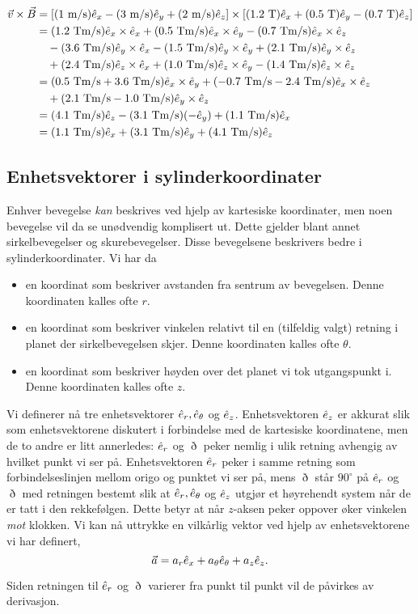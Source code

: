 \begin{displaymath}
\begin{aligned}
	\vec{v}\times\vec{B} &= \left[ (1~\mathrm{m/s})\hat{e}_x - (3~\mathrm{m/s})\hat{e}_y + (2~\mathrm{m/s})\hat{e}_z \right] \times
	\left[(1.2~\mathrm{T})\hat{e}_x + (0.5~\mathrm{T})\hat{e}_y - (0.7~\mathrm{T})\hat{e}_z\right] \\
	&= (1.2~\mathrm{Tm/s})\hat{e}_x\times\hat{e}_x + (0.5~\mathrm{Tm/s})\hat{e}_x\times\hat{e}_y -  (0.7~\mathrm{Tm/s})\hat{e}_x\times\hat{e}_z \\
	&\quad- (3.6~\mathrm{Tm/s})\hat{e}_y\times\hat{e}_x- (1.5~\mathrm{Tm/s})\hat{e}_y\times\hat{e}_y+ (2.1~\mathrm{Tm/s})\hat{e}_y\times\hat{e}_z \\
	&\quad+ (2.4~\mathrm{Tm/s})\hat{e}_z\times\hat{e}_x+ (1.0~\mathrm{Tm/s})\hat{e}_z\times\hat{e}_y -  (1.4~\mathrm{Tm/s})\hat{e}_z\times\hat{e}_z \\
	&=(0.5~\mathrm{Tm/s}+3.6~\mathrm{Tm/s})\hat{e}_x\times\hat{e}_y + (-0.7~\mathrm{Tm/s}-2.4~\mathrm{Tm/s})\hat{e}_x\times\hat{e}_z \\
	&\quad+(2.1~\mathrm{Tm/s}-1.0~\mathrm{Tm/s})\hat{e}_y\times\hat{e}_z \\
	&=(4.1~\mathrm{Tm/s})\hat{e}_z - (3.1~\mathrm{Tm/s})(-\hat{e}_y) +(1.1~\mathrm{Tm/s})\hat{e}_x \\
	&=(1.1~\mathrm{Tm/s})\hat{e}_x + (3.1~\mathrm{Tm/s})\hat{e}_y + (4.1~\mathrm{Tm/s})\hat{e}_z
\end{aligned}
\end{displaymath}

\subsection{Enhetsvektorer i sylinderkoordinater}
Enhver bevegelse \emph{kan} beskrives ved hjelp av kartesiske koordinater, men noen bevegelse vil da se unødvendig komplisert ut. Dette gjelder blant annet sirkelbevegelser og skurebevegelser. Disse bevegelsene beskrivers bedre i sylinderkoordinater. Vi har da
\begin{itemize}
\item
 en koordinat som beskriver avstanden fra sentrum av bevegelsen. Denne koordinaten kalles ofte $r$.
\item
 en koordinat som beskriver vinkelen relativt til en (tilfeldig valgt) retning i planet der sirkelbevegelsen skjer. Denne koordinaten kalles ofte $\theta$.
\item
en koordinat som beskriver høyden over det planet vi tok utgangspunkt i. Denne koordinaten kalles ofte $z$. 
\end{itemize}
Vi definerer nå tre enhetsvektorer $\hat{e}_r, \hat{e}_\theta$ og $\hat{e}_z$. Enhetsvektoren $\hat{e}_z$ er akkurat slik som enhetsvektorene diskutert i forbindelse med de kartesiske koordinatene, men de to andre er litt annerledes: $\hat{e}_r$ og $\eth$ peker nemlig i ulik retning avhengig av hvilket punkt vi ser på. Enhetsvektoren $\hat{e}_r$ peker i samme retning som forbindelseslinjen mellom origo og punktet vi ser på, mens $\eth$ står $90^\circ$ på $\hat{e}_r$ og $\eth$ med retningen bestemt slik at $\hat{e}_r, \hat{e}_\theta$ og $\hat{e}_z$ utgjør et høyrehendt system når de er tatt i den rekkefølgen. Dette betyr at når $z$-aksen peker oppover øker vinkelen \emph{mot} klokken. Vi kan nå uttrykke en vilkårlig vektor ved hjelp av enhetsvektorene vi har definert,
\begin{displaymath}
	\vec{a} = a_r\hat{e}_x + a_\theta\hat{e}_\theta + a_z\hat{e}_z.
\end{displaymath}

Siden retningen til $\hat{e}_r$ og $\eth$ varierer fra punkt til punkt vil de påvirkes av derivasjon. 
